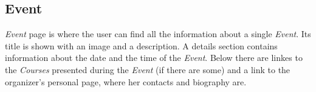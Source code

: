 \documentclass[../../DD.tex]{subfiles}
\begin{document}
	\subsection{Event}
		\textit{Event} page is where the user can find all the information about a single \textit{Event}. Its title is shown with an image and a description. A details section contains information about the date and the time of the \textit{Event}. Below there are linkes to the \textit{Courses} presented during the \textit{Event} (if there are some) and a link to the organizer's personal page, where her contacts and biography are.
		\newline
\end{document}
